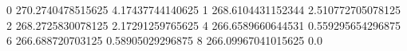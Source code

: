 0 270.2740478515625 4.17437744140625
1 268.6104431152344 2.510772705078125
2 268.2725830078125 2.17291259765625
4 266.6589660644531 0.559295654296875
6 266.688720703125 0.58905029296875
8 266.09967041015625 0.0
